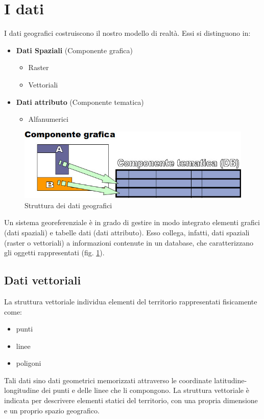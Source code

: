 \section{I dati}
I dati geografici costruiscono il nostro modello di realtà. Essi si distinguono in:
\begin{itemize}
\item \textbf{Dati Spaziali} (Componente grafica)
\begin{itemize}
\item Raster
\item Vettoriali
\end{itemize}
\item \textbf{Dati attributo} (Componente tematica)
\begin{itemize}
\item Alfanumerici
\end{itemize}
\end{itemize}

\begin{figure}
\includegraphics[scale=0.4]{./imgs/strutturedatigeograficiimage.jpg}
\caption{Struttura dei dati geografici\label{ref:strutturedatigeograficiimage}}
\end{figure}

Un sistema georeferenziale è in grado di gestire in modo integrato elementi grafici (dati spaziali) e tabelle dati (dati attributo).
Esso collega, infatti, dati spaziali (raster o vettoriali) a informazioni contenute in un database, che caratterizzano gli oggetti rappresentati (fig. \ref{ref:strutturedatigeograficiimage}).

\subsection{Dati vettoriali}
La struttura vettoriale individua elementi del territorio rappresentati fisicamente come:
\begin{itemize}
\item punti
\item linee
\item poligoni
\end{itemize}
Tali dati sino dati geometrici memorizzati attraverso le coordinate latitudine-longitudine dei punti e delle linee che li compongono.
La struttura vettoriale è indicata per descrivere elementi statici del territorio, con una propria dimensione e un proprio spazio geografico.

